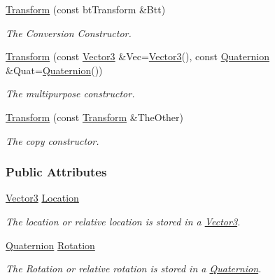 \begin{DoxyCompactItemize}
\hyperlink{classMezzanine_1_1Transform_ad4974a80bdb1625119e98b059e4e91e0}{Transform} (const btTransform \&Btt)
\begin{DoxyCompactList}\small\item\em The Conversion Constructor. \item\end{DoxyCompactList}\item 
\hyperlink{classMezzanine_1_1Transform_a0949c0923e41e00af6c9537d5f9094b7}{Transform} (const \hyperlink{classMezzanine_1_1Vector3}{Vector3} \&Vec=\hyperlink{classMezzanine_1_1Vector3}{Vector3}(), const \hyperlink{classMezzanine_1_1Quaternion}{Quaternion} \&Quat=\hyperlink{classMezzanine_1_1Quaternion}{Quaternion}())
\begin{DoxyCompactList}\small\item\em The multipurpose constructor. \item\end{DoxyCompactList}\item 
\hyperlink{classMezzanine_1_1Transform_ad719d3280b8b94f27b5ba1ce3e8a9a59}{Transform} (const \hyperlink{classMezzanine_1_1Transform}{Transform} \&TheOther)
\begin{DoxyCompactList}\small\item\em The copy constructor. \item\end{DoxyCompactList}\end{DoxyCompactItemize}
\subsubsection*{Public Attributes}
\begin{DoxyCompactItemize}
\item 
\hypertarget{classMezzanine_1_1Transform_a93498c9bcba2298f199f9ab04671a944}{
\hyperlink{classMezzanine_1_1Vector3}{Vector3} \hyperlink{classMezzanine_1_1Transform_a93498c9bcba2298f199f9ab04671a944}{Location}}
\label{classMezzanine_1_1Transform_a93498c9bcba2298f199f9ab04671a944}

\begin{DoxyCompactList}\small\item\em The location or relative location is stored in a \hyperlink{classMezzanine_1_1Vector3}{Vector3}. \item\end{DoxyCompactList}\item 
\hypertarget{classMezzanine_1_1Transform_a4f41685c108f02fd4faad209b1a438ef}{
\hyperlink{classMezzanine_1_1Quaternion}{Quaternion} \hyperlink{classMezzanine_1_1Transform_a4f41685c108f02fd4faad209b1a438ef}{Rotation}}
\label{classMezzanine_1_1Transform_a4f41685c108f02fd4faad209b1a438ef}

\begin{DoxyCompactList}\small\item\em The Rotation or relative rotation is stored in a \hyperlink{classMezzanine_1_1Quaternion}{Quaternion}. \item\end{DoxyCompactList}\end{DoxyCompactItemize}


